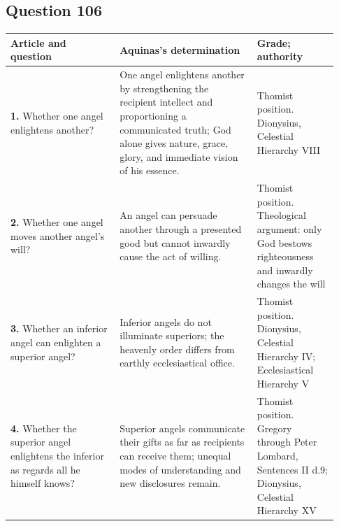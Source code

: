 \subsection{Question 106}
\begin{longtable}{@{}>{\raggedright\arraybackslash}p{0.31\linewidth}>{\raggedright\arraybackslash}p{0.39\linewidth}>{\raggedright\arraybackslash}p{0.23\linewidth}@{}}
\toprule
Article and question & Aquinas's determination & Grade; authority\\
\midrule\endhead
\textbf{1.} Whether one angel enlightens another? & One angel enlightens another by strengthening the recipient intellect and proportioning a communicated truth; God alone gives nature, grace, glory, and immediate vision of his essence. & Thomist position. Dionysius, Celestial Hierarchy VIII\\
\textbf{2.} Whether one angel moves another angel's will? & An angel can persuade another through a presented good but cannot inwardly cause the act of willing. & Thomist position. Theological argument: only God bestows righteousness and inwardly changes the will\\
\textbf{3.} Whether an inferior angel can enlighten a superior angel? & Inferior angels do not illuminate superiors; the heavenly order differs from earthly ecclesiastical office. & Thomist position. Dionysius, Celestial Hierarchy IV; Ecclesiastical Hierarchy V\\
\textbf{4.} Whether the superior angel enlightens the inferior as regards all he himself knows? & Superior angels communicate their gifts as far as recipients can receive them; unequal modes of understanding and new disclosures remain. & Thomist position. Gregory through Peter Lombard, Sentences II d.9; Dionysius, Celestial Hierarchy XV\\
\bottomrule
\end{longtable}
